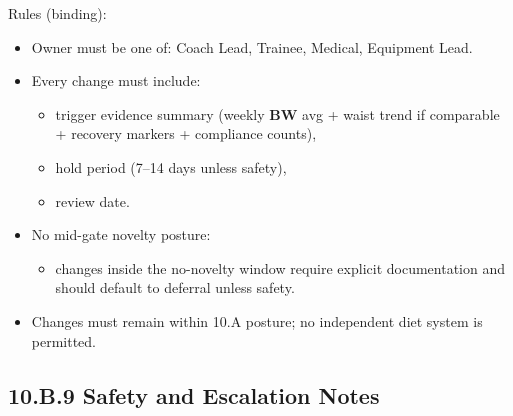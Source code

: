 \documentclass[10pt]{article}
\begin{document}
\endgroup

Rules (binding):

\begin{itemize}
\item Owner must be one of: Coach Lead, Trainee, Medical, Equipment Lead.
\item Every change must include:
\begin{itemize}
\item trigger evidence summary (weekly \textbf{BW} avg + waist trend if comparable + recovery markers + compliance counts),
\item hold period (7–14 days unless safety),
\item review date.
\end{itemize}
\item No mid-gate novelty posture:
\begin{itemize}
\item changes inside the no-novelty window require explicit documentation and should default to deferral unless safety.
\end{itemize}
\item Changes must remain within 10.A posture; no independent diet system is permitted.
\end{itemize}

\newpage
\subsection*{10.B.9 Safety and Escalation Notes}
{}
\end{document}
